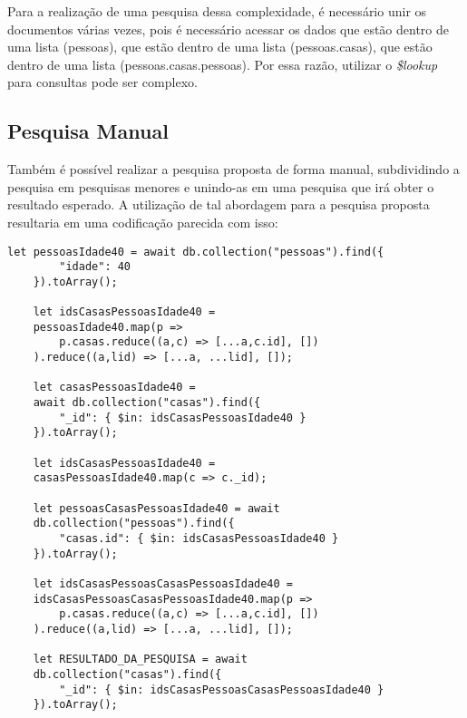 Para a realização de uma pesquisa dessa complexidade, é necessário unir os documentos várias vezes, pois é necessário acessar os dados que estão dentro de uma lista (pessoas), que estão dentro de uma lista (pessoas.casas), que estão dentro de uma lista (pessoas.casas.pessoas). Por essa razão, utilizar o \textit{\$lookup} para consultas pode ser complexo.

\subsection{Pesquisa Manual}
    
Também é possível realizar a pesquisa proposta de forma manual, subdividindo a pesquisa em pesquisas menores e unindo-as em uma pesquisa que irá obter o resultado esperado. A utilização de tal abordagem para a pesquisa proposta resultaria em uma codificação parecida com isso:

\newpage


\begin{lstlisting}[style=ES6, caption={Busca em Dados Normalizados de Forma Manual}]
    let pessoasIdade40 = await db.collection("pessoas").find({
        "idade": 40
    }).toArray();
    
    let idsCasasPessoasIdade40 = 
    pessoasIdade40.map(p => 
        p.casas.reduce((a,c) => [...a,c.id], [])
    ).reduce((a,lid) => [...a, ...lid], []);
    
    let casasPessoasIdade40 =
    await db.collection("casas").find({
        "_id": { $in: idsCasasPessoasIdade40 }
    }).toArray();
    
    let idsCasasPessoasIdade40 = 
    casasPessoasIdade40.map(c => c._id);
    
    let pessoasCasasPessoasIdade40 = await
    db.collection("pessoas").find({
        "casas.id": { $in: idsCasasPessoasIdade40 }
    }).toArray();
    
    let idsCasasPessoasCasasPessoasIdade40 = 
    idsCasasPessoasCasasPessoasIdade40.map(p => 
        p.casas.reduce((a,c) => [...a,c.id], [])
    ).reduce((a,lid) => [...a, ...lid], []);
    
    let RESULTADO_DA_PESQUISA = await
    db.collection("casas").find({
        "_id": { $in: idsCasasPessoasCasasPessoasIdade40 }
    }).toArray();
\end{lstlisting}

